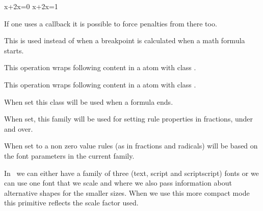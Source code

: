 { \let\mathpenaltiesmode\scratchcounter \startformula \showmakeup[hpenalty]x+2x=0 \stopformula}
{ \let\mathpenaltiesmode\scratchcounter \startformula \showmakeup[hpenalty]x+2x=1 \stopformula}

\popoverloadmode

If one uses a callback it is possible to force penalties from there too.

\stopnewprimitive

\startnewprimitive[title={\prm {mathpretolerance}}]

This is used instead of  when a breakpoint is calculated when
a math formula starts.

\stopnewprimitive

\startoldprimitive[title={\prm {mathpunct}}]

This operation wraps following content in a atom with class .

\stopoldprimitive

\startoldprimitive[title={\prm {mathrel}}]

This operation wraps following content in a atom with class .

\stopoldprimitive

\startnewprimitive[title={\prm {mathrightclass}}]

When set this class will be used when a formula ends.

\stopnewprimitive

\startnewprimitive[title={\prm {mathrulesfam}}]

When set, this family will be used for setting rule properties in fractions,
under and over.

\stopnewprimitive

\startnewprimitive[title={\prm {mathrulesmode}}]

When set to a non zero value rules (as in fractions and radicals) will be based
on the font parameters in the current family.

\stopnewprimitive

\startnewprimitive[title={\prm {mathscale}}]

In \LUAMETATEX\ we can either have a family of three (text, script and
scriptscript) fonts or we can use one font that we scale and where we also pass
information about alternative shapes for the smaller sizes. When we use this
more compact mode this primitive reflects the scale factor used.

\startbuffer
\im {
    \textstyle        \the\mathscale\textfont        \fam\enspace
    \scriptstyle      \the\mathscale\scriptfont      \fam\enspace
    \scriptscriptstyle\the\mathscale\scriptscriptfont\fam\enspace
    \textstyle        \the\mathscale\textfont        \fam\enspace
    \scriptstyle      \the\mathscale\textfont        \fam\enspace
    \scriptscriptstyle\the\mathscale\textfont        \fam

}
\stopbuffer

